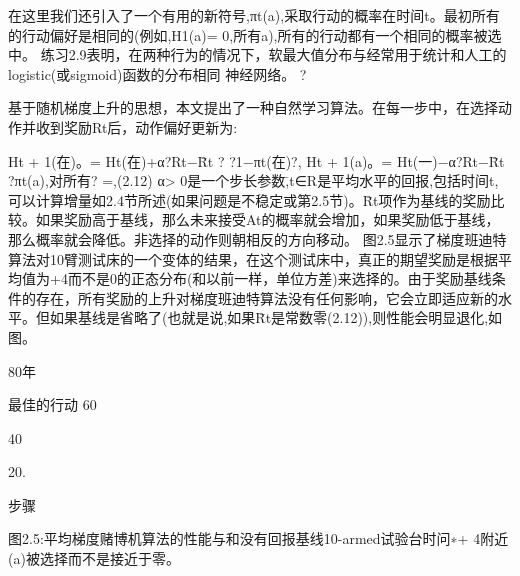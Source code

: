 在这里我们还引入了一个有用的新符号,πt(a),采取行动的概率在时间t。最初所有的行动偏好是相同的(例如,H1(a)= 0,所有a),所有的行动都有一个相同的概率被选中。
练习2.9表明，在两种行为的情况下，软最大值分布与经常用于统计和人工的logistic(或sigmoid)函数的分布相同
神经网络。 					?

基于随机梯度上升的思想，本文提出了一种自然学习算法。在每一步中，在选择动作并收到奖励Rt后，动作偏好更新为:


Ht + 1(在)。= Ht(在)+α?Rt−R̄t ? ?1−πt(在)?,
Ht + 1(a)。= Ht(一)−α?Rt−R̄t ?πt(a),对所有? =,(2.12)
α> 0是一个步长参数,̄t∈R是平均水平的回报,包括时间t,可以计算增量如2.4节所述(如果问题是不稳定或第2.5节)。R̄t项作为基线的奖励比较。如果奖励高于基线，那么未来接受At的概率就会增加，如果奖励低于基线，那么概率就会降低。非选择的动作则朝相反的方向移动。
图2.5显示了梯度班迪特算法对10臂测试床的一个变体的结果，在这个测试床中，真正的期望奖励是根据平均值为+4而不是0的正态分布(和以前一样，单位方差)来选择的。由于奖励基线条件的存在，所有奖励的上升对梯度班迪特算法没有任何影响，它会立即适应新的水平。但如果基线是省略了(也就是说,如果R̄t是常数零(2.12)),则性能会明显退化,如图。

80年



%
最佳的行动
60



40



20.




步骤

图2.5:平均梯度赌博机算法的性能与和没有回报基线10-armed试验台时问∗+ 4附近(a)被选择而不是接近于零。

